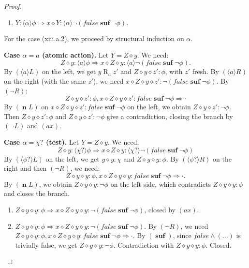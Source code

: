 \documentclass[manuscript,screen]{acmart}
\newcommand{\la}[0]{\langle}
\newcommand{\ra}[0]{\rangle}
\newcommand{\false}[0]{\mathit{false}}
\newcommand{\cat}[0]{\diamond}
\DeclareMathOperator{\osuf}{\mathbf{suf}}
\DeclareMathOperator{\R}{R}
\DeclareMathOperator{\nxt}{\mathbf{n}}
\begin{document}
\begin{proof}
\begin{enumerate}
    \item[(xiii.a.2)] $Y : \la\alpha\ra\phi\Rightarrow x\cat Y : \la\alpha\ra\neg(\false\osuf\neg\phi)$. 
\end{enumerate}

For the case (xiii.a.2), we proceed by structural induction on $\alpha$. 

\textbf{Case $\alpha = a$ (atomic action).} Let $Y = Z\cat y$. We need:
$$
Z\cat y : \la a\ra\phi\Rightarrow x\cat Z\cat y : \la a\ra\neg(\false\osuf\neg\phi). 
$$
By $(\la a\ra L)$ on the left, we get $y\R_a z'$ and $Z\cat y\cat z' : \phi$, with $z'$ fresh. By $(\la a\ra R)$ on the right (with the same $z'$), we need $x\cat Z\cat y\cat z' : \neg(\false\osuf\neg\phi)$. By $(\neg R)$:
$$
Z\cat y\cat z' : \phi, x\cat Z\cat y\cat z' : \false\osuf\neg\phi\Rightarrow \cdot
$$
By $(\nxt L)$ on $x\cat Z\cat y\cat z' : \false\osuf\neg\phi$ on the left, we obtain $Z\cat y\cat z' : \neg\phi$. Then $Z\cat y\cat z' : \phi$ and $Z\cat y\cat z' : \neg\phi$ give a contradiction, closing the branch by $(\neg L)$ and $(\textit{ax})$. 

\textbf{Case $\alpha = \chi?$ (test).} Let $Y = Z\cat y$. We need:
$$
Z\cat y : \la\chi?\ra\phi\Rightarrow x\cat Z\cat y : \la\chi?\ra\neg(\false\osuf\neg\phi)
$$
By $(\la\phi?\ra L)$ on the left, we get $y\cat y : \chi$ and $Z\cat y\cat y : \phi$. By $(\la\phi?\ra R)$ on the right and then $(\neg R)$, we need:
$$
Z\cat y\cat y : \phi, x\cat Z\cat y\cat y : \false\osuf\neg\phi\Rightarrow \cdot. 
$$
By $(\nxt L)$, we obtain $Z\cat y\cat y : \neg\phi$ on the left side, which contradicts $Z\cat y\cat y : \phi$ and closes the branch. 

\ifx
\begin{enumerate}
    \item[(xiii.a.$\chi?$.1)] $Z\cat y\cat y : \phi\Rightarrow x\cat Z\cat y\cat y : \neg(\false\osuf\neg\phi)$, closed by $(\textit{ax})$.
    \item[(xiii.a.$\chi?$.2)] $Z\cat y\cat y : \phi\Rightarrow x\cat Z\cat y\cat y : \neg(\false\osuf\neg\phi)$. By $(\neg R)$, we need $Z\cat y\cat y : \phi, x\cat Z\cat y\cat y : \false\osuf\neg\phi\Rightarrow \cdot$. By $(\osuf)$, since $\false\wedge(...)$ is trivially false, we get $Z\cat y\cat y : \neg\phi$. Contradiction with $Z\cat y\cat y : \phi$. Closed.
\end{enumerate}
\fi


\end{proof}
\end{document}
